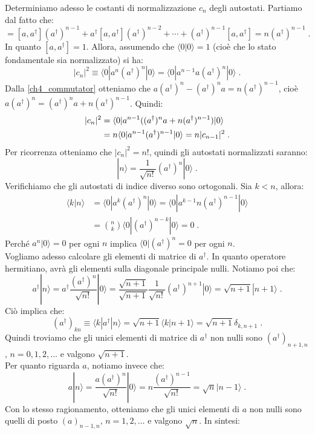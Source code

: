 \documentclass[10pt,a4paper]{report}
\theoremstyle{definition}
\numberwithin{equation}{section}
\newcommand{\bra}{\langle}
\newcommand{\ket}{\rangle}
\newcommand{\adj}[1]{#1^{\dagger}}
\begin{document}
Determiniamo adesso le costanti di normalizzazione $c_n$ degli autostati. Partiamo dal fatto che:
\begin{equation}
[a,(\adj{a})^n]=[a,\adj{a}](\adj{a})^{n-1}+\adj{a}[a,\adj{a}](\adj{a})^{n-2}+\cdots+(\adj{a})^{n-1}[a,\adj{a}]=n(\adj{a})^{n-1}\;. \label{ch4_commutator}
\end{equation}
In quanto $[a,\adj{a}]=1$. Allora, assumendo che $\bra 0|0\ket=1$ (cioè che lo stato fondamentale sia normalizzato) si ha:
$$
|c_n|^2\equiv \bra 0|a^n(\adj{a})^n|0\ket=\bra 0|a^{n-1}a(\adj{a})^n|0\ket\;.
$$
Dalla \eqref{ch4_commutator} otteniamo che $a(\adj{a})^n-(\adj{a})^na=n(\adj{a})^{n-1}$, cioè $a(\adj{a})^n=(\adj{a})^na+n(\adj{a})^{n-1}$. Quindi:
\begin{align}
|c_n|^2&=\bra 0|a^{n-1}((\adj{a})^na+n(\adj{a})^{n-1})|0\ket \notag \\
&= n\bra 0|a^{n-1}(\adj{a})^{n-1}|0\ket=n|c_{n-1}|^2\;.
\end{align}
Per ricorrenza otteniamo che $|c_n|^2=n!$, quindi gli autostati normalizzati saranno:
\begin{equation}
|n\ket=\frac{1}{\sqrt{n!}}(\adj{a})^n|0\ket\;.
\end{equation}
Verifichiamo che gli autostati di indice diverso sono ortogonali. Sia $k<n$, allora:
\begin{align*}
\bra k|n\ket &= \bra 0|a^k(\adj{a})^n|0\ket=\bra 0|a^{k-1}n(\adj{a})^{n-1}|0\ket  \\
&=\binom{n}{k}\bra 0|(\adj{a})^{n-k}|0\ket=0\;.
\end{align*}
Perché $a^n|0\ket=0$ per ogni $n$ implica $\bra 0|(\adj{a})^n=0$ per ogni $n$. \\
Vogliamo adesso calcolare gli elementi di matrice di $\adj{a}$. In quanto operatore hermitiano, avrà gli elementi sulla diagonale principale nulli. Notiamo poi che:
$$
\adj{a}|n\ket=\adj{a}\frac{(\adj{a})^n}{\sqrt{n!}}|0\ket=\frac{\sqrt{n+1}}{\sqrt{n+1}}\frac{1}{\sqrt{n!}}(\adj{a})^{n+1}|0\ket=\sqrt{n+1}|n+1\ket\;.
$$
Ciò implica che:
$$
(\adj{a})_{kn}\equiv\bra k|\adj{a}|n\ket=\sqrt{n+1}\bra k|n+1\ket=\sqrt{n+1}\delta_{k,n+1}\;.
$$
Quindi troviamo che gli unici elementi di matrice di $\adj{a}$ non nulli sono $(\adj{a})_{n+1,n}$, $n=0,1,2,\ldots$ e valgono $\sqrt{n+1}$. \\
Per quanto riguarda $a$, notiamo invece che:
$$
a|n\ket=\frac{a(\adj{a})^n}{\sqrt{n!}}|0\ket=n\frac{(\adj{a})^{n-1}}{\sqrt{n!}}=\sqrt{n}|n-1\ket\;.
$$
Con lo stesso ragionamento, otteniamo che gli unici elementi di $a$ non nulli sono quelli di posto $(a)_{n-1,n}$, $n=1,2,\ldots$ e valgono $\sqrt{n}$. In sintesi:
\end{document}
